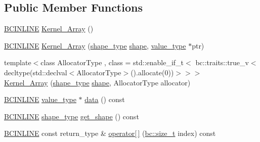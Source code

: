 \subsection*{Public Member Functions}
\begin{DoxyCompactItemize}
\item 
\hyperlink{common_8h_a6699e8b0449da5c0fafb878e59c1d4b1}{B\+C\+I\+N\+L\+I\+NE} \hyperlink{structbc_1_1tensors_1_1exprs_1_1Kernel__Array_aa95e24993611ac81660689a5f95529e4}{Kernel\+\_\+\+Array} ()
\item 
\hyperlink{common_8h_a6699e8b0449da5c0fafb878e59c1d4b1}{B\+C\+I\+N\+L\+I\+NE} \hyperlink{structbc_1_1tensors_1_1exprs_1_1Kernel__Array_aabd83677fd69cc08ffdc444335bcfee5}{Kernel\+\_\+\+Array} (\hyperlink{structbc_1_1tensors_1_1exprs_1_1Kernel__Array_ae6a4db456a47818cda06bb76d05a3b6e}{shape\+\_\+type} \hyperlink{namespacebc_a1bc6dec532973ac024c738c0fd32cca3}{shape}, \hyperlink{structbc_1_1tensors_1_1exprs_1_1Kernel__Array_ae8195ebc960dd40b6c731a269c00e37b}{value\+\_\+type} $\ast$ptr)
\item 
{\footnotesize template$<$class Allocator\+Type , class  = std\+::enable\+\_\+if\+\_\+t$<$				bc\+::traits\+::true\+\_\+v$<$						decltype(std\+::declval$<$\+Allocator\+Type$>$().\+allocate(0))$>$$>$$>$ }\\\hyperlink{structbc_1_1tensors_1_1exprs_1_1Kernel__Array_a07ea2391c45d7a07913bcf361e4ecc22}{Kernel\+\_\+\+Array} (\hyperlink{structbc_1_1tensors_1_1exprs_1_1Kernel__Array_ae6a4db456a47818cda06bb76d05a3b6e}{shape\+\_\+type} \hyperlink{namespacebc_a1bc6dec532973ac024c738c0fd32cca3}{shape}, Allocator\+Type allocator)
\item 
\hyperlink{common_8h_a6699e8b0449da5c0fafb878e59c1d4b1}{B\+C\+I\+N\+L\+I\+NE} \hyperlink{structbc_1_1tensors_1_1exprs_1_1Kernel__Array_ae8195ebc960dd40b6c731a269c00e37b}{value\+\_\+type} $\ast$ \hyperlink{structbc_1_1tensors_1_1exprs_1_1Kernel__Array_a6d9defe5c32be9ebd98ea024e7b748a7}{data} () const
\item 
\hyperlink{common_8h_a6699e8b0449da5c0fafb878e59c1d4b1}{B\+C\+I\+N\+L\+I\+NE} \hyperlink{structbc_1_1tensors_1_1exprs_1_1Kernel__Array_ae6a4db456a47818cda06bb76d05a3b6e}{shape\+\_\+type} \hyperlink{structbc_1_1tensors_1_1exprs_1_1Kernel__Array_ade157280b1466add51cecfeca946549a}{get\+\_\+shape} () const
\item 
\hyperlink{common_8h_a6699e8b0449da5c0fafb878e59c1d4b1}{B\+C\+I\+N\+L\+I\+NE} const return\+\_\+type \& \hyperlink{structbc_1_1tensors_1_1exprs_1_1Kernel__Array_a29d6f89a439f2abef2236e9552c07e62}{operator\mbox{[}$\,$\mbox{]}} (\hyperlink{namespacebc_aaf8e3fbf99b04b1b57c4f80c6f55d3c5}{bc\+::size\+\_\+t} index) const

\end{DoxyCompactItemize}
